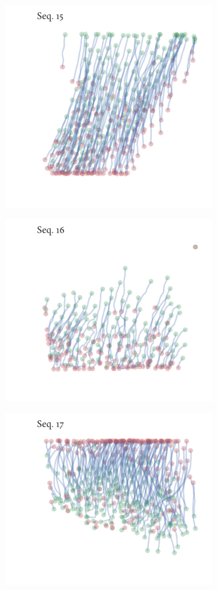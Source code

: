 \begin{figure}[h]
\begin{subfigure}[t]{0.5\textwidth}
		\includegraphics{sequence15.pdf}
	\end{subfigure}%
	\begin{subfigure}[t]{0.5\textwidth}
		\centering
		\includegraphics{sequence16.pdf}
	\end{subfigure}
	\begin{subfigure}[t]{0.5\textwidth}
		\centering
		\includegraphics{sequence17.pdf}

\end{subfigure}
\end{figure}
